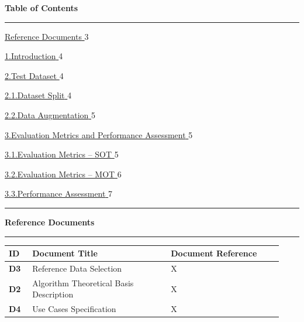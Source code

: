 \documentclass[
]{article}
\begin{document}
\newpage

{\centering\Large\bfseries Table of Contents\par}
\vspace{0.8cm}
\noindent\rule{\linewidth}{0.6pt}

\newcommand{\tocentry}[3]{%
  \noindent\hyperlink{#1}{%
    {\normalsize #2}%
  }\hfill{\normalsize #3}\par\vspace{0.25cm}%
}
\newcommand{\tocsub}[3]{%
  \noindent\hspace{1.2em}\hyperlink{#1}{%
    {\normalsize\color{gray} #2}%
  }\hfill{\normalsize\color{gray} #3}\par\vspace{0.2cm}%
}

\tocentry{_Toc1974584720}{Reference Documents}{3}
\tocentry{introduction}{1.\enspace Introduction}{4}
\tocentry{Test dataset}{2.\enspace Test Dataset}{4}
\tocsub{dataset-split}{2.1.\enspace Dataset Split}{4}
\tocsub{data-augmentation}{2.2.\enspace Data Augmentation}{5}
\tocentry{Evaluation Metrics and Performance Assessment}{3.\enspace Evaluation Metrics and Performance Assessment}{5}
\tocsub{Evaluation Metrics - SOT}{3.1.\enspace Evaluation Metrics -- SOT}{5}
\tocsub{Evaluation Metrics - MOT}{3.2.\enspace Evaluation Metrics -- MOT}{6}
\tocsub{Performance assessment}{3.3.\enspace Performance Assessment}{7}

\vspace{0.1cm}
\noindent\rule{\linewidth}{0.6pt}

\newpage

\protect\hypertarget{_Toc1974584720}{}{}%
{\centering\Large\bfseries Reference Documents\par}
\vspace{0.6cm}
\noindent\rule{\linewidth}{0.6pt}

\renewcommand{\arraystretch}{1.5}
\begin{longtable}[]{@{}
  >{\centering\bfseries\arraybackslash}p{0.08\linewidth}
  >{\raggedright\arraybackslash}p{0.47\linewidth}
  >{\raggedright\arraybackslash}p{0.38\linewidth}@{}}
\rowcolor{gray!20}
\textbf{ID} & \textbf{Document Title} & \textbf{Document Reference} \\
\midrule\noalign{}
\endhead
\bottomrule\noalign{}
\endlastfoot
D3 & Reference Data Selection & X \\
D2 & Algorithm Theoretical Basis Description & X \\
D4 & Use Cases Specification & X \\
\end{longtable}
\renewcommand{\arraystretch}{1}
\end{document}
